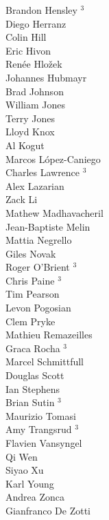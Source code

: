 \documentclass[PICOReport.tex]{subfiles}
\begin{document}
{{\begin{multicols}{4}
Brandon Hensley $^3$                \\
Diego Herranz                   \\
Colin Hill                      \\
Eric Hivon                      \\
Ren\'{e}e  Hlo\v{z}ek           \\
Johannes Hubmayr                \\
Brad Johnson                    \\
William Jones                   \\
Terry Jones                     \\
Lloyd Knox                      \\
Al Kogut                        \\
Marcos L\'{o}pez-Caniego        \\
Charles Lawrence  $^3$              \\
Alex Lazarian                   \\
Zack Li                         \\
Mathew Madhavacheril            \\
Jean-Baptiste Melin             \\
Mattia Negrello                 \\
Giles Novak                     \\
Roger O'Brient $^3$                 \\
Chris Paine $^3$                    \\
Tim Pearson                     \\
Levon Pogosian                  \\
Clem Pryke                      \\
Mathieu Remazeilles             \\
Graca Rocha $^3$                    \\
Marcel Schmittfull              \\
Douglas Scott                   \\
Ian Stephens                    \\
Brian Sutin $^3$                    \\
Maurizio Tomasi                 \\
Amy Trangsrud $^3$                  \\
Flavien Vansyngel               \\
Qi Wen                          \\
Siyao Xu                        \\
Karl Young                      \\
Andrea Zonca                    \\
Gianfranco De Zotti             
\end{multicols}
}

}
\end{document}
